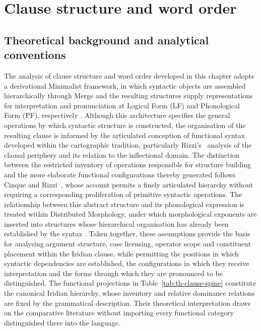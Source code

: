 \chapter{Clause structure and word order}\label{ch:clause-structure}\label{ch:simple}

\section{Theoretical background and analytical conventions}
\label{sec:th-background}

The analysis of clause structure and word order developed in this chapter
adopts a derivational Minimalist framework, in which syntactic objects are
assembled hierarchically through Merge and the resulting structures supply
representations for interpretation and pronunciation at Logical Form (LF)
and Phonological Form (PF), respectively
\cites[ch.~3]{chomsky1995}{chomsky2000}. Although this architecture
specifies the general operations by which syntactic structure is
constructed, the organisation of the resulting clause is informed by the
articulated conception of functional syntax developed within the
cartographic tradition, particularly Rizzi's~\cite[§1]{rizzi1997} analysis
of the clausal periphery and its relation to the inflectional domain. The
distinction between the restricted inventory of operations responsible for
structure building and the more elaborate functional configurations thereby
generated follows Cinque and Rizzi~\cite[§5]{cinquerizzi2010}, whose account
permits a finely articulated hierarchy without requiring a corresponding
proliferation of primitive syntactic operations. The relationship between
this abstract structure and its phonological expression is treated within
Distributed Morphology, under which morphological exponents are inserted
into structures whose hierarchical organisation has already been established
by the syntax \cite{embicknoyer2007}. Taken together, these assumptions
provide the basis for analysing argument structure, case licensing, operator
scope and constituent placement within the Iridian clause, while permitting
the positions in which syntactic dependencies are established, the
configurations in which they receive interpretation and the forms through
which they are pronounced to be distinguished. The functional projections in
Table~\ref{tab:th-clause-spine} constitute the canonical Iridian hierarchy,
whose inventory and relative dominance relations are fixed by the grammatical
description. Their theoretical interpretation draws on the comparative
literature without importing every
functional category distinguished there into the language.

